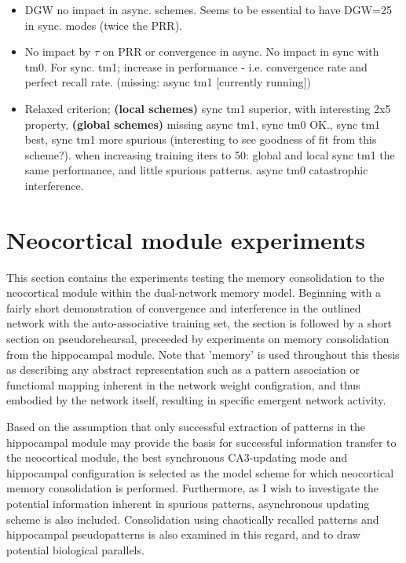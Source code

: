 \begin{itemize}
    \item DGW no impact in async. schemes. Seems to be essential to have DGW=25 in sync. modes (twice the PRR).
    \item No impact by $\tau$ on PRR or convergence in async. No impact in sync with tm0. For sync. tm1; increase in performance - i.e. convergence rate and perfect recall rate. (missing: async tm1 [currently running])
    \item Relaxed criterion; \textbf{(local schemes)} sync tm1 superior, with interesting 2x5 property, \textbf{(global schemes)} missing async tm1, sync tm0 OK., sync tm1 best, sync tm1 more spurious (interesting to see goodness of fit from this scheme?). when increasing training iters to 50: global and local sync tm1 the same performance, and little spurious patterns. async tm0 catastrophic interference.
\end{itemize}



\section{Neocortical module experiments}

This section contains the experiments testing the memory consolidation to the neocortical module within the dual-network memory model. Beginning with a fairly short demonstration of convergence and interference in the outlined network with the auto-associative training set, the section is followed by a short section on pseudorehearsal, preceeded by experiments on memory consolidation from the hippocampal module. Note that 'memory' is used throughout this thesis as describing any abstract representation such as a pattern association or functional mapping inherent in the network weight configration, and thus embodied by the network itself, resulting in specific emergent network activity.

Based on the assumption that only successful extraction of patterns in the hippocampal module may provide the basis for successful information transfer to the neocortical module, the best synchronous CA3-updating mode and hippocampal configuration is selected as the model scheme for which neocortical memory consolidation is performed. Furthermore, as I wish to investigate the potential information inherent in spurious patterns, asynchronous updating scheme is also included. Consolidation using chaotically recalled patterns and hippocampal pseudopatterns is also examined in this regard, and to draw potential biological parallels.



